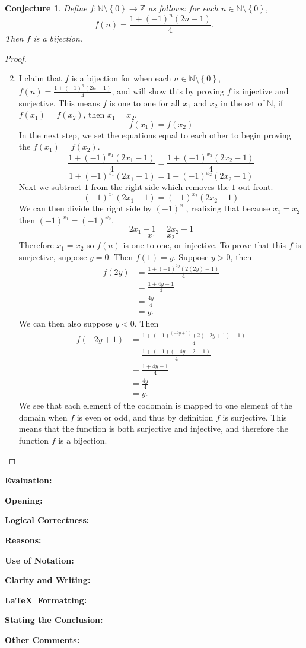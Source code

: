 \documentclass[11pt,titlepage]{article}		%
\newcommand{\set}[1]{\left\{ {#1} \right\}}
\def\rubric{\textbf{Evaluation:} \makebox[0.75in]{\hrulefill}

\vspace{.3in}

\textbf{Opening:} \makebox[0.75in]{\hrulefill}

\vspace{.3in}

\textbf{Logical Correctness:} \makebox[0.75in]{\hrulefill}

\vspace{.3in}

\textbf{Reasons:} \makebox[0.75in]{\hrulefill}

\vspace{.3in}

\textbf{Use of Notation:} \makebox[0.75in]{\hrulefill}

\vspace{.3in}

\textbf{Clarity and Writing:} \makebox[0.75in]{\hrulefill}

\vspace{.3in}

\textbf{\LaTeX\ Formatting:} \makebox[0.75in]{\hrulefill}

\vspace{.3in}

\textbf{Stating the Conclusion:} \makebox[0.75in]{\hrulefill}

\vspace{.3in}

\textbf{Other Comments:}

\vspace{1in}

}
\def\Z{{\mathbb Z}}
\def\N{{\mathbb N}}
\newtheorem{conjecture}[theorem]{Conjecture}
\theoremstyle{definition}
\theoremstyle{theorem}
\begin{document}
\clearpage
\begin{conjecture}
Define $f: \N\setminus\set{0}\to\Z$ as follows: for each $n\in \N\setminus \set{0}$,
\[
f(n) = \frac{1+(-1)^n (2n-1)}{4}.
\]
Then $f$ is a bijection.
\end{conjecture}
\begin{proof}
\begin{enumerate}
    \setcounter{enumi}{1}
    \item 
        I claim that $f$ is a bijection for when each $n\in \N\setminus \set{0}$, $f(n) = \frac{1+(-1)^n (2n-1)}{4}$, and will show this by proving $f$ is injective and surjective.
        This means $f$ is one to one for all $x_1$ and $x_2$ in the set of $\N$, if $f(x_1) = f(x_2)$, then $x_1 = x_2$.
        \[
        f(x_1) = f(x_2)
        \]
        In the next step, we set the equations equal to each other to begin proving the $f(x_1) = f(x_2).$
        \[
        \frac{1+(-1)^{x_1} (2x_1-1)}{4} = \frac{1+(-1)^{x_2} (2x_2-1)}{4}
        \]
        \[
        {1+(-1)^{x_1} (2x_1-1)} = {1+(-1)^{x_2} (2x_2-1)}
        \]
        Next we subtract $1$ from the right side which removes the $1$ out front.
        \[
        {(-1)^{x_1} (2x_1-1)} = {(-1)^{x_2} (2x_2-1)}
        \]
        We can then divide the right side by ${(-1)^{x_1}}$, realizing that because $x_1 = x_2$ then $(-1)^{x_1} = (-1)^{x_2}$.
        \[
        2x_1-1 = 2x_2-1
        \]
        \[
        x_1 = x_2
        \]
        Therefore $x_1 = x_2$ so $f(n)$ is one to one, or injective.
        To prove that this $f$ is surjective, suppose $y=0$. Then $f(1) = y$. Suppose $y>0$, then
        \begin{align*}
            f(2y) & = \frac{1+(-1)^{2y}(2(2y)-1)}{4}\\
            & = \frac{1+4y-1}{4}\\
            & = \frac{4y}{4}\\
            & = y.
        \end{align*}
        We can then also suppose $y<0$. Then
        \begin{align*}
            f(-2y+1) & = \frac{1+(-1)^{(-2y+1)}(2(-2y+1)-1)}{4}\\
            & = \frac{1+(-1)(-4y+2-1)}{4}\\
            & = \frac{1+4y-1}{4}\\
            & = \frac{4y}{4}\\
            & = y.
        \end{align*}
        We see that each element of the codomain is mapped to one element of the domain when $f$ is even or odd, and thus by definition $f$ is surjective.
        This means that the function is both surjective and injective, and therefore the function $f$ is a bijection.

\end{enumerate}
\end{proof}
\rubric
\end{document}
